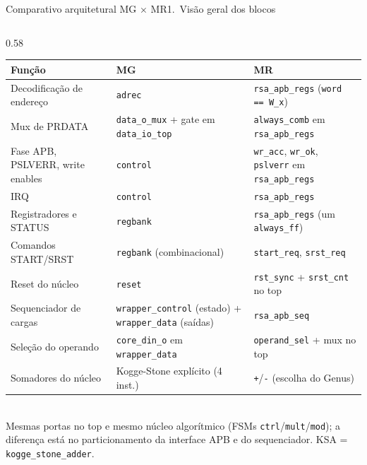 \documentclass[aspectratio=169,10pt,t]{beamer}
\begin{document}
\begin{frame}[fragile]{Comparativo arquitetural MG × MR}{1.~Visão geral dos blocos}
\begin{columns}[T]
\begin{column}{0.58\textwidth}
      \begin{tabularx}{\linewidth}{@{}>{\raggedright\arraybackslash}p{1.75cm} >{\raggedright\arraybackslash}X >{\raggedright\arraybackslash}X@{}}
        \toprule
        \textbf{Função} & \textbf{MG} & \textbf{MR} \\
        \midrule
        Decodificação de endereço & \texttt{adrec} & \texttt{rsa\_apb\_regs} (\texttt{word == W\_x}) \\
        Mux de PRDATA & \texttt{data\_o\_mux} + gate em \texttt{data\_io\_top} & \texttt{always\_comb} em \texttt{rsa\_apb\_regs} \\
        Fase APB, PSLVERR, write enables & \texttt{control} & \texttt{wr\_acc}, \texttt{wr\_ok}, \texttt{pslverr} em \texttt{rsa\_apb\_regs} \\
        IRQ & \texttt{control} & \texttt{rsa\_apb\_regs} \\
        Registradores e STATUS & \texttt{regbank} & \texttt{rsa\_apb\_regs} (um \texttt{always\_ff}) \\
        Comandos START/SRST & \texttt{regbank} (combinacional) & \texttt{start\_req}, \texttt{srst\_req} \\
        Reset do núcleo & \texttt{reset} & \texttt{rst\_sync} + \texttt{srst\_cnt} no top \\
        Sequenciador de cargas & \texttt{wrapper\_control} (estado) + \texttt{wrapper\_data} (saídas) & \texttt{rsa\_apb\_seq} \\
        Seleção do operando & \texttt{core\_din\_o} em \texttt{wrapper\_data} & \texttt{operand\_sel} + mux no top \\
        Somadores do núcleo & Kogge-Stone explícito (4 inst.) & \texttt{+}/\texttt{-} (escolha do Genus) \\
        \bottomrule
      \end{tabularx}\\[0.1cm]
      {\tiny Mesmas portas no top e mesmo núcleo algorítmico (FSMs \texttt{ctrl}/\texttt{mult}/\texttt{mod}); a diferença está no particionamento da interface APB e do sequenciador. KSA = \texttt{kogge\_stone\_adder}.}
    \end{column}
  \end{columns}
\end{frame}
\end{document}

